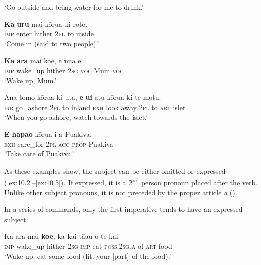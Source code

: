 \glt 
‘Go outside and bring water for me to drink.’ \textstyleExampleref{[R229.231]} 
\z

\ea\label{ex:10.2}
\gll \textbf{Ka} \textbf{uru} mai kōrua ki roto. \\
\textsc{imp} enter hither \textsc{2pl} to inside \\

\glt 
‘Come in (said to two people).’ \textstyleExampleref{[R229.261]} 
\z

\ea\label{ex:10.3}
\gll \textbf{Ka} \textbf{{\ꞌ}ara} mai koe, e nua ē. \\
\textsc{imp} wake\_up hither \textsc{2sg} \textsc{voc} Mum \textsc{voc} \\

\glt 
‘Wake up, Mum.’ \textstyleExampleref{[R229.315]} 
\z

\ea\label{ex:10.4}
\gll Ana tomo kōrua ki {\ꞌ}uta, \textbf{e} \textbf{u{\ꞌ}i} atu kōrua ki te motu.\\
\textsc{irr} go\_ashore \textsc{2pl} to inland \textsc{exh} look away \textsc{2pl} to \textsc{art} islet\\

\glt 
‘When you go ashore, watch towards the islet.’ \textstyleExampleref{[Ley-2-02.005]}
\z

\ea\label{ex:10.5}
\gll \textbf{E} \textbf{hāpa{\ꞌ}o} kōrua i a Puakiva. \\
\textsc{exh} care\_for \textsc{2pl} \textsc{acc} \textsc{prop} Puakiva \\

\glt
‘Take care of Puakiva.’ \textstyleExampleref{[R229.420–421]}
\z

As these examples show, the subject can be either omitted  or expressed (\ref{ex:10.2}–\ref{ex:10.5}). If expressed, it is a 2\textsuperscript{nd} person pronoun placed after the verb. Unlike other subject pronouns, it is not preceded by the proper article \textit{a} (). 

In a series of commands, only the first imperative tends to have an expressed subject:

\ea\label{ex:10.6}
\gll Ka {\ꞌ}ara mai \textbf{koe}, ka kai tā{\ꞌ}au o te kai. \\
\textsc{imp} wake\_up hither \textsc{2sg} \textsc{imp} eat \textsc{poss.2sg.a} of \textsc{art} food \\

\glt
‘Wake up, eat some food (lit. your [part] of the food).’ \textstyleExampleref{[R310.104]} 
\z

